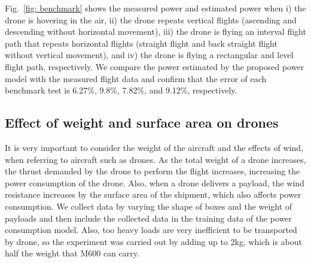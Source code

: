 \documentclass[journal]{./template/IEEEtran}
\begin{document}
Fig.~\ref{fig: benchmark} shows the measured power and estimated power when i) the drone is hovering in the air, ii) the drone repeats vertical flights (ascending and descending without horizontal movement), iii) the drone is flying an interval flight path that repeats horizontal flights (straight flight and back straight flight without vertical movement), and iv) the drone is flying a rectangular and level flight path, respectively. 
We compare the power estimated by the proposed power model with the measured flight data and confirm that the error of each benchmark test is 6.27\%, 9.8\%, 7.82\%, and 9.12\%, respectively.





\subsection{Effect of weight and surface area on drones}
It is very important to consider the weight of the aircraft and the effects of wind, when referring to aircraft such as drones.
As the total weight of a drone increases, the thrust demanded by the drone to perform the flight increases, increasing the power consumption of the drone. 
Also, when a drone delivers a payload, the wind resistance increases by the surface area of the shipment, which also affects power consumption.
We collect data by varying the shape of boxes and the weight of payloads and then include the collected data in the training data of the power consumption model.
Also, too heavy loads are very inefficient to be transported by drone, so the experiment was carried out by adding up to 2kg, which is about half the weight that M600 can carry.
\end{document}
